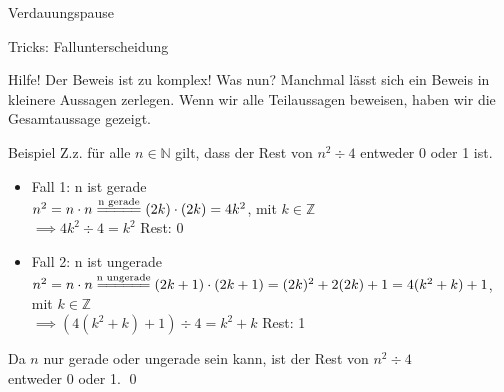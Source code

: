 \begin{frame}[standout]
    Verdauungspause
\end{frame}

\begin{frame}[fragile]{Tricks: Fallunterscheidung}
    \begin{alertblock}{Hilfe! Der Beweis ist zu komplex! Was nun?}
        Manchmal lässt sich ein Beweis in kleinere Aussagen zerlegen. Wenn wir alle Teilaussagen beweisen, haben wir die Gesamtaussage gezeigt.
    \end{alertblock}
    \small\begin{exampleblock}{Beispiel}
        Z.z. für alle $n\in\mathbb{N}$ gilt, dass der Rest von $n^2 \div 4$ entweder 0 oder 1 ist.
        \footnotesize\begin{itemize}
            \item 
                \alert{Fall 1:} n ist gerade\\
                $n^2=n\cdot n\overset{\text{n gerade}}{=\joinrel=\joinrel=\joinrel=\joinrel=}(2k)\cdot(2k) = 4k^2$,  mit $k\in\mathbb{Z}$\\
                $\implies 4k^2 \div 4 = k^2$ Rest: 0
            \item \alert{Fall 2:} n ist ungerade\\
                $n^2=n\cdot n\overset{\text{n ungerade}}{=\joinrel=\joinrel=\joinrel=\joinrel=\joinrel=}(2k+1)\cdot(2k+1)=(2k)^2+2(2k)+1=4(k^2+k)+1$, \\mit $k\in\mathbb{Z}$\\
                $\implies (4(k^2+k)+1) \div 4= k^2+k$ Rest: 1
        \end{itemize}
        Da $n$ nur gerade oder ungerade sein kann, ist der Rest von $n^2\div4$ \\entweder 0 oder 1. \qed\;
    \end{exampleblock}
\end{frame}


